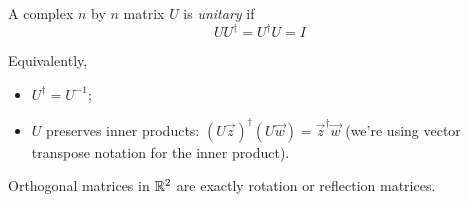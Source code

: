 \documentclass{../../template/note}
\begin{document}
    \begin{definition}
        A complex \(n\) by \(n\) matrix \(U\) is \emph{unitary} if
        \[
            UU^\dagger = U^\dagger U = I
        \]
    \end{definition}
    Equivalently,
    \begin{itemize}
        \item \(U^\dagger = U^{-1}\);
        \item \(U\) preserves inner products: \((U \vec z)^\dagger (U \vec w) = \vec z^\dagger \vec w\) (we're using vector transpose notation for the inner product).
    \end{itemize}
    
    \begin{lemma}
        Orthogonal matrices in \(\mathbb R^2\) are exactly rotation or reflection matrices.
    \end{lemma}
    
\end{document}
